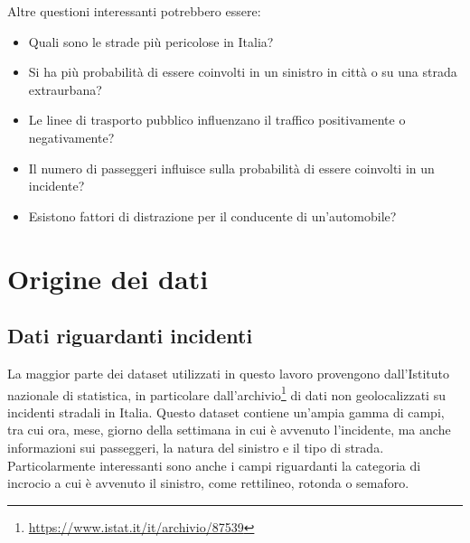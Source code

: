 \documentclass[a4paper,12pt]{report}
\begin{document}
Altre questioni interessanti potrebbero essere:
\begin{itemize}
    \item Quali sono le strade più pericolose in Italia?
    \item Si ha più probabilità di essere coinvolti in un sinistro in città o su una strada extraurbana? 
    \item Le linee di trasporto pubblico influenzano il traffico positivamente o negativamente?
    \item Il numero di passeggeri influisce sulla probabilità di essere coinvolti in un incidente? 
    \item Esistono fattori di distrazione per il conducente di un'automobile? 
\end{itemize}

\chapter{Origine dei dati}

\section{Dati riguardanti incidenti}

La maggior parte dei dataset utilizzati in questo lavoro 
provengono dall'Istituto nazionale di statistica, in particolare 
dall'archivio\footnote{\url{https://www.istat.it/it/archivio/87539}}
di dati non geolocalizzati su incidenti stradali in Italia.
Questo dataset contiene un'ampia gamma di campi, tra cui ora, 
mese, giorno della settimana in cui è avvenuto l'incidente, 
ma anche informazioni sui passeggeri, la natura del sinistro e il tipo di strada. 
Particolarmente interessanti sono anche i campi riguardanti la categoria di incrocio 
a cui è avvenuto il sinistro, come rettilineo, rotonda o semaforo.
\end{document}
